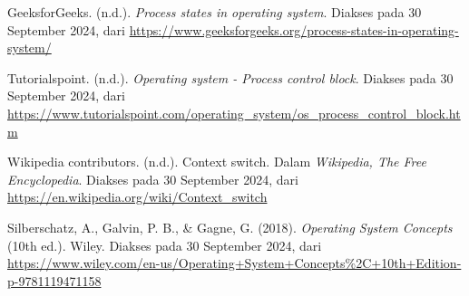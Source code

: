 \documentclass[12pt]{article}
\begin{document}
\begin{thebibliography}{}

\bibitem{}
GeeksforGeeks. (n.d.). \textit{Process states in operating system}. Diakses pada 30 September 2024, dari \url{https://www.geeksforgeeks.org/process-states-in-operating-system/}

\bibitem{}
Tutorialspoint. (n.d.). \textit{Operating system - Process control block}. Diakses pada 30 September 2024, dari \url{https://www.tutorialspoint.com/operating_system/os_process_control_block.htm}

\bibitem{}
Wikipedia contributors. (n.d.). Context switch. Dalam \textit{Wikipedia, The Free Encyclopedia}. Diakses pada 30 September 2024, dari \url{https://en.wikipedia.org/wiki/Context_switch}

Silberschatz, A., Galvin, P. B., \& Gagne, G. (2018). \textit{Operating System Concepts} (10th ed.). Wiley. Diakses pada 30 September 2024, dari \url{https://www.wiley.com/en-us/Operating+System+Concepts%2C+10th+Edition-p-9781119471158}

\end{thebibliography}
\end{document}
